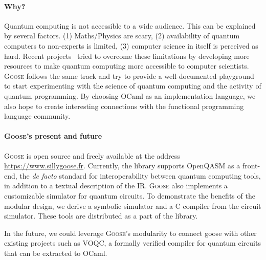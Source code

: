 \documentclass[a4paper]{easychair}
\newcommand{\projname}{\textsc{Goose}}
\newcommand{\projurl}{\url{https://www.sillygoose.fr}}
\begin{document}
\paragraph*{Why?} Quantum computing is not accessible to a wide audience. This can be explained by several factors.
 (1) Maths/Physics are scary, 
(2) availability of quantum computers to non-experts is limited, (3) computer science in itself is perceived as hard.
Recent projects~\cite{} tried to overcome these limitations by developing more resources to make quantum computing more accessible to computer scientists.
 \projname{} follows the same track and try to provide a well-documented playground to start experimenting with the science of quantum computing and the activity of quantum programming.
By choosing OCaml as an implementation language, we also hope to create interesting connections with the functional programming language community.

\paragraph*{\projname{}'s present and future} \projname{} is open source and freely available at the address \projurl{}.
Currently, the library supports OpenQASM as a front-end, the \textit{de facto} standard for interoperability between quantum computing tools, in addition to a textual description of the IR. \projname{} also implements a customizable simulator for quantum circuits. To demonstrate the benefits of the modular design, we derive a symbolic simulator and a C compiler from the circuit simulator. These tools are distributed as a part of the library.

In the future, we could leverage \projname{}'s modularity to connect goose with other existing projects such as VOQC, a formally verified compiler for quantum circuits that can be extracted to OCaml.





\end{document}
